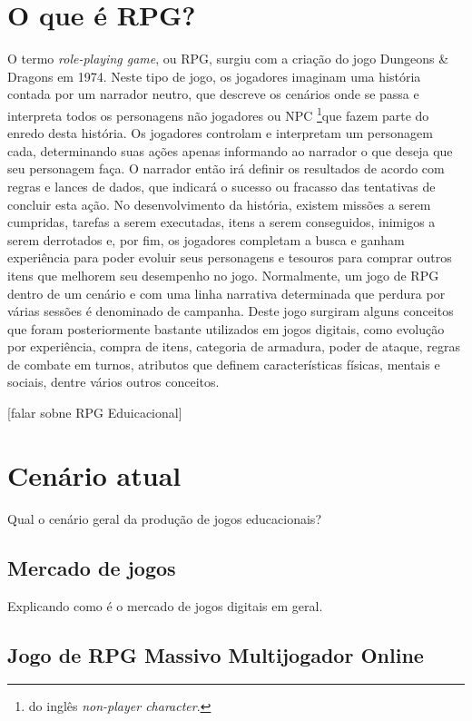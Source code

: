 \documentclass[
	12pt,				%
	openright,			%
	twoside,			%
	a4paper,			%
	english,			%
	french,				%
	spanish,			%
	brazil				%
	]{abntex2}
\begin{document}
\section{O que é RPG?}
O termo \emph{role-playing game}, ou RPG, surgiu com a criação do jogo Dungeons \& Dragons em 1974. Neste tipo de jogo, os jogadores imaginam uma história contada por um narrador neutro, que descreve os cenários onde se passa e interpreta todos os personagens não jogadores ou NPC \footnote{do inglês \emph{non-player character}.}que fazem parte do enredo desta história. Os jogadores controlam e interpretam um personagem cada, determinando suas ações apenas informando ao narrador o que deseja que seu personagem faça. O narrador então irá  definir os resultados de acordo com regras e lances de dados, que indicará o sucesso ou fracasso das tentativas de concluir esta ação. No desenvolvimento da história, existem missões a serem cumpridas, tarefas a serem executadas, itens a serem conseguidos, inimigos a serem derrotados e, por fim, os jogadores completam a busca e ganham experiência para poder evoluir seus personagens e tesouros para comprar outros itens que melhorem seu desempenho no jogo. Normalmente, um jogo de RPG dentro de um cenário e com uma linha narrativa determinada que perdura por várias sessões é denominado de campanha. Deste jogo surgiram alguns conceitos que foram posteriormente bastante utilizados em jogos digitais, como evolução por experiência, compra de itens, categoria de armadura, poder de ataque, regras de combate em turnos, atributos que definem características físicas, mentais e sociais, dentre vários outros conceitos.

[falar sobne RPG Eduicacional]


\section{Cenário atual} 
Qual o cenário geral da produção de jogos educacionais?
\subsection{Mercado de jogos}

Explicando como é o mercado de jogos digitais em geral.

\subsection{Jogo de RPG Massivo Multijogador Online}
\end{document}
